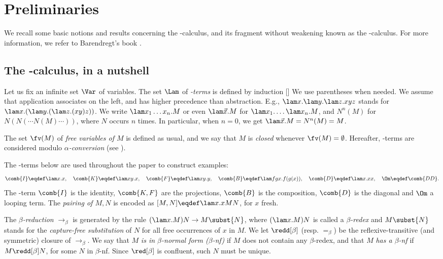 
\section{Preliminaries}

We recall some basic notions and results concerning the \lam-calculus, and its fragment without weakening known as the \lamI-calculus. For more information, we refer to Barendregt's book \cite{Bare}.

\subsection{The \lam-calculus, in a nutshell} 
Let us fix an infinite set $\Var$ of variables. The set $\Lam$ of 
\emph{\lam-terms} is defined by induction
[]
We use parentheses when needed.
We assume that application associates on the left, 
and has higher precedence than abstraction.
E.g., $\lam x.\lam y.\lam z.xyz$ stands for $\lam x.(\lam y.(\lam z.(xy)z))$.
We write $\lam x_1 \ldots x_n.M$ or even $\lam\vec x.M$ 
for $\lam x_1.\ldots \lam x_n.M$, 
and $N^n(M)$ for $N(N(\cdots N(M)\cdots))$, where $N$ occurs $n$ times. 
In particular, when $n = 0$, we get $\lam\vec x.M = N^n(M) = M$.

The set $\fv(M)$ of \emph{free variables of $M$} is defined as usual, and we say that $M$ is \emph{closed} whenever $\fv(M) = \emptyset$.
Hereafter, \lam-terms are considered modulo \emph{$\alpha$-conversion}
(see \cite[\S 2.1]{Bare}).

\begin{example}\label{ex:combinators}
The \lam-terms below are used throughout the paper to construct examples:
\[
	\comb{I} \eqdef \lam x.x,\quad 
	 \comb{K} \eqdef \lam xy.x,\quad 
	 \comb{F} \eqdef \lam xy.y,\quad 
	 \comb{B} \eqdef \lam fgx.f(g(x)),\quad
 	 \comb{D} \eqdef \lam x.xx,\quad
	 \Om \eqdef \comb{DD}.
\]
The \lam-term $\comb{I}$ is the identity, $\comb{K,F}$ are the projections, $\comb{B}$ is the composition, $\comb{D}$ is the diagonal and $\Om$ a looping term.
The \emph{pairing of $M,N$} is encoded as $[M,N] \eqdef \lam x.xMN$, for $x$ fresh. 
\end{example}
The \emph{$\beta$-reduction} $\to_\beta$ is generated by the rule
$
	(\lam x.M)N\to M\subst{N}
$, where $(\lam x.M)N$ is called a \emph{$\beta$-redex} and $M\subst{N}$ stands for the \emph{capture-free substitution} of $N$ for all free occurrences of $x$ in $M$. 
We let $\redd[\beta]$ (resp. $=_\beta$) be the reflexive-transitive (and symmetric) closure of $\to_\beta$.
We say that $M$ \emph{is in $\beta$-normal form ($\beta$-nf)} if $M$ does not contain any $\beta$-redex, and that $M$ \emph{has a $\beta$-nf} if $M\redd[\beta] N$, for some $N$ in $\beta$-nf.
Since $\red[\beta]$ is confluent, such $N$ must be unique.

